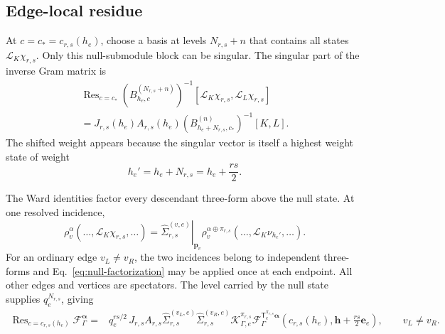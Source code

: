 \documentclass[11pt]{article}
\newcommand{\F}{\mathcal F}
\newcommand{\ve}{\bm e}
\DeclareMathOperator{\Res}{Res}
\begin{document}
\subsection{Edge-local residue}
\label{sec:residue-derivation}

At \(c=c_*=c_{r,s}(h_e)\), choose a basis at levels
\(N_{r,s}+n\) that contains all states
\(\mathcal L_K\chi_{r,s}\).  Only this null-submodule block can be singular.
The singular part of the inverse Gram matrix is
\begin{multline}
 \Res_{c=c_*}
 \left(B_{h_e,c}^{(N_{r,s}+n)}\right)^{-1}
 [\mathcal L_K\chi_{r,s},\mathcal L_L\chi_{r,s}]
 \\
 =J_{r,s}(h_e)A_{r,s}(h_e)
  \left(B_{h_e+N_{r,s},c_*}^{(n)}\right)^{-1}[K,L].
 \label{eq:inverse-gram-residue}
\end{multline}
The shifted weight appears because the singular vector is itself a highest
weight state of weight
\begin{equation}
 h_e'=h_e+N_{r,s}=h_e+\frac{rs}{2}.
 \label{eq:shifted-weight}
\end{equation}

The Ward identities factor every descendant three-form above the null
state.  At one resolved incidence,
\begin{equation}
 \rho_v^\alpha(\ldots,\mathcal L_K\chi_{r,s},\ldots)
 =\left.\widehat\Sigma_{r,s}^{(v,e)}\right|_{\bm p_v}
  \rho_v^{\alpha\oplus\pi_{r,s}}
  (\ldots,\mathcal L_K\nu_{h_e'},\ldots).
 \label{eq:null-factorization}
\end{equation}
For an ordinary edge \(v_L\ne v_R\), the two incidences belong to independent
three-forms and Eq.~\eqref{eq:null-factorization} may be applied once at each
endpoint.  All other edges and vertices are spectators.  The level carried by
the null state supplies \(q_e^{N_{r,s}}\), giving
\begin{equation}
\boxed{\begin{aligned}
 \Res_{c=c_{r,s}(h_e)}\F_\Gamma^{\bm\alpha}
 ={}&q_e^{rs/2}\,
  J_{r,s}A_{r,s}
  \widehat\Sigma_{r,s}^{(v_L,e)}
  \widehat\Sigma_{r,s}^{(v_R,e)}
  \mathcal K_{\Gamma,e}^{\pi_{r,s}}
  \F_\Gamma^{\mathsf T_e^{\pi_{r,s}}\bm\alpha}
  \left(c_{r,s}(h_e),
        \bm h+\frac{rs}{2}\ve_e\right),
 \qquad v_L\ne v_R.
\end{aligned}}
 \label{eq:edge-residue}
\end{equation}
\end{document}
